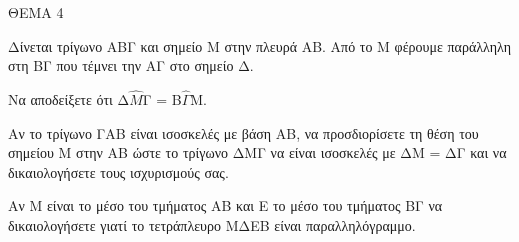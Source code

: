 
ΘΕΜΑ 4

Δίνεται τρίγωνο ΑΒΓ και σημείο Μ στην πλευρά ΑΒ. Από το Μ φέρουμε παράλληλη στη ΒΓ που τέμνει την ΑΓ στο σημείο Δ.

\begin{alist}
\item Να αποδείξετε ότι Δ$\widehat{Μ}$Γ = Β$\widehat{\Gamma}$Μ. 

\item Αν το τρίγωνο ΓΑΒ είναι ισοσκελές με βάση ΑΒ, να προσδιορίσετε τη θέση του σημείου Μ στην ΑΒ ώστε το τρίγωνο ΔΜΓ να είναι ισοσκελές με ΔΜ = ΔΓ και να δικαιολογήσετε τους ισχυρισμούς σας. 

\item Αν Μ είναι το μέσο του τμήματος ΑΒ και Ε το μέσο του τμήματος ΒΓ να δικαιολογήσετε γιατί το τετράπλευρο ΜΔΕΒ είναι παραλληλόγραμμο. 
\end{alist}
